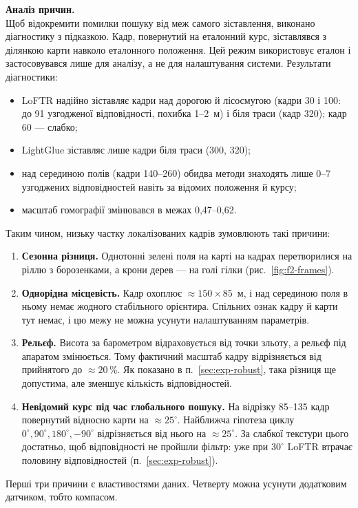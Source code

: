 \documentclass[a4paper, 12pt, titlepage]{article}
\begin{document}
\textbf{Аналіз причин.}\\
Щоб відокремити помилки пошуку від меж самого зіставлення, виконано діагностику з підказкою. Кадр, повернутий на еталонний курс, зіставлявся з ділянкою карти навколо еталонного положення. Цей режим використовує еталон і застосовувався лише для аналізу, а не для налаштування системи. Результати діагностики:
\begin{itemize}
    \item LoFTR надійно зіставляє кадри над дорогою й лісосмугою (кадри 30 і 100: до 91 узгодженої відповідності, похибка 1--2~м) і біля траси (кадр 320); кадр 60 --- слабко;
    \item LightGlue зіставляє лише кадри біля траси (300, 320);
    \item над серединою полів (кадри 140--260) обидва методи знаходять лише 0--7 узгоджених відповідностей навіть за відомих положення й курсу;
    \item масштаб гомографії змінювався в межах 0,47--0,62.
\end{itemize}

Таким чином, низьку частку локалізованих кадрів зумовлюють такі причини:
\begin{enumerate}
    \item \textbf{Сезонна різниця.} Однотонні зелені поля на карті на кадрах перетворилися на ріллю з борозенками, а крони дерев --- на голі гілки (рис.~\ref{fig:f2-frames}).
    \item \textbf{Однорідна місцевість.} Кадр охоплює $\approx 150 \times 85$~м, і над серединою поля в ньому немає жодного стабільного орієнтира. Спільних ознак кадру й карти тут немає, і цю межу не можна усунути налаштуванням параметрів.
    \item \textbf{Рельєф.} Висота за барометром відраховується від точки зльоту, а рельєф під апаратом змінюється. Тому фактичний масштаб кадру відрізняється від прийнятого до $\approx 20$\,\%. Як показано в п.~\ref{sec:exp-robust}, така різниця ще допустима, але зменшує кількість відповідностей.
    \item \textbf{Невідомий курс під час глобального пошуку.} На відрізку 85--135 кадр повернутий відносно карти на $\approx 25^\circ$. Найближча гіпотеза циклу $0^\circ, 90^\circ, 180^\circ, -90^\circ$ відрізняється від нього на $\approx 25^\circ$. За слабкої текстури цього достатньо, щоб відповідності не пройшли фільтр: уже при $30^\circ$ LoFTR втрачає половину відповідностей (п.~\ref{sec:exp-robust}).
\end{enumerate}
Перші три причини є властивостями даних. Четверту можна усунути додатковим датчиком, тобто компасом.
\end{document}
